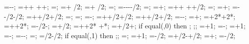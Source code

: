 {{\engbedrockstarty=-\soilbelowfoundtof-\engbedrockdepth;
\engbedrockdeltax=\leftsoildist+\engbedrockleftdist+
  \buildingwidth+\rightsoildist+\engbedrockrightdist;
\engbedrockdeltay=\engbedrockdepth;
\engbedrockmidx=\engbedrockstartx + \engbedrockdeltax/2;
\engbedrockmidy=\engbedrockstarty + \engbedrockdeltay/2;
\translayerlinet=\showtranslayer*\translayerlinet;
\translayerleftstartx=-\supportwidth-\hsdistleft-\leftsoildist-\translayerlinet/2;
\translayerleftstarty=\leftwallh;
\translayerleftdeltay=\leftwallh+\soilbelowfoundtof;
\translayerrightstartx=\supportwidth+\hsdistright+
	\rightsoildist+\buildingwidth+\translayerlinet/2;
\translayerrightstarty=\rightwallh;
\translayerrightdeltay=\rightwallh+\soilbelowfoundtof;
\ssinterleftstartx=-\supportwidth-\baselinet/2-\ssinterlinet/2;
\ssinterrightstartx=\buildingwidth+\supportwidth+\baselinet/2+\ssinterlinet/2;
\ssinterleftstarty=\leftwallh;
\ssinterrightstarty=\rightwallh;
\ssinterdeltax=\ssinterrightstartx-\ssinterleftstartx;
\ssinterleftdeltay=\leftwallh+\supportheight+\baselinet/2+\ssinterlinet/2;
\ssinterrightdeltay=\rightwallh+\supportheight+\baselinet/2+\ssinterlinet/2;
\markssleftstartx=-\supportwidth-\markssexspace;
\markssleftstarty=\basewalldepth+\markssexspace;
\markssdeltax=\buildingwidth+2*\supportwidth+2*\markssexspace;
\markssdeltay=\basewalldepth+\supportheight+2*\markssexspace;
\supershadestartx=-\collinet/2-\supershadespace;
\supershadestarty=\basewalldepth+\baselinet/2;
\supershadedeltax=\buildingwidth+\collinet+2*\supershadespace
 +*\showdefl;
\supershadedeltay=\superstorynumber*\storyheight+\beamlinet/2+\supershadespace;
if equal(\showlessbays,0) then {
;
;};
\startcol=\leftbays+1;
\endcol=\columnnumber-\rightbays;
\startbeam=\leftbays+1;
\endbeam=\baynumber-\rightbays;
\superbays=\baynumber-\leftbays-\rightbays;
\superwidth=\superbays*\baywidth;
\groundbeamshifty=\groundbeamlinet/2-\baselinet/2;
if equal(\showdefl,1) then {;};
\shearwallstartcolumn=\shearwallbay;
\shearwallendcolumn=\shearwallbay+1;
\shearwallstartx=\x{\shearwallstartcolumn}-\collinet/2;
\shearwallstarty=+\baselinet/2-+\shearwalllinet/2;
\shearwalldeltax=\baywidth+\collinet;
\shearwallsupportstartx=\shearwallstartx-\supportwidth/2;
}}
